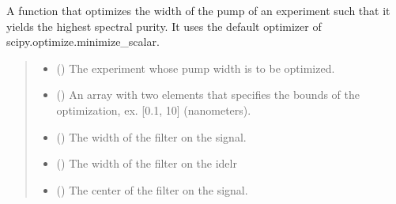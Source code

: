 \documentclass[a4paper,10pt,english]{sphinxmanual}
\begin{document}
\begin{fulllineitems}
\label{\detokenize{experiment:pyjsa.experiment.find_optimal_pump_width}}
\pysigstartsignatures
{}
\pysigstopsignatures
\sphinxAtStartPar
A function that optimizes the width of the pump of an experiment such that it yields the highest spectral purity. It uses the default optimizer of scipy.optimize.minimize\_scalar.
\begin{quote}\begin{description}
\begin{itemize}
\item {} 
\sphinxAtStartPar
{} ({\hyperref[\detokenize{experiment:pyjsa.experiment.Experiment}]{}}) \textendash{} The experiment whose pump width is to be optimized.

\item {} 
\sphinxAtStartPar
{} (\sphinxstyleliteralemphasis{\sphinxupquote{, }}) \textendash{} An array with two elements that specifies the bounds of the optimization, ex. {[}0.1, 10{]} (nanometers).

\item {} 
\sphinxAtStartPar
{} () \textendash{} The width of the filter on the signal.

\item {} 
\sphinxAtStartPar
{} () \textendash{} The width of the filter on the idelr

\item {} 
\sphinxAtStartPar
{} () \textendash{} The center of the filter on the signal.


\end{itemize}
\end{description}
\end{quote}
\end{fulllineitems}
\end{document}
